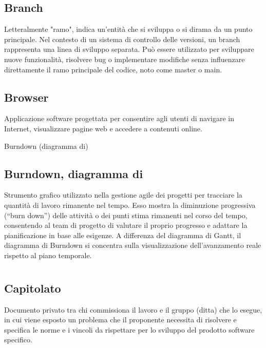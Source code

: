 \hypertarget{sec:branch}{}
\subsection*{Branch}
Letteralmente "ramo", indica un’entità che si sviluppa o si dirama da un punto principale. Nel contesto di un sistema di controllo delle versioni, 
un branch rappresenta una linea di sviluppo separata. Può essere utilizzato per sviluppare nuove funzionalità, risolvere bug o implementare modifiche 
senza influenzare direttamente il ramo principale del codice, noto come master o main.

\hypertarget{sec:browser}{}
\subsection*{Browser}
Applicazione software progettata per consentire agli utenti di navigare in Internet, visualizzare pagine web e accedere a contenuti online.

\hypertarget{sec:diagramma_di_burndown}{Burndown (diagramma di)}
\subsection*{Burndown, diagramma di}
Strumento grafico utilizzato nella gestione agile dei progetti per tracciare la quantità di lavoro rimanente nel tempo. 
Esso mostra la diminuzione progressiva (“burn down”) delle attività o dei punti stima rimanenti nel corso del tempo, 
consentendo al team di progetto di valutare il proprio progresso e adattare la pianificazione in base alle esigenze. 
A differenza del diagramma di Gantt, il diagramma di Burndown si concentra sulla visualizzazione dell’avanzamento reale rispetto al piano temporale.

\newpage




\section{}

\hypertarget{sec:capitolato}{}
\subsection*{Capitolato}
Documento privato tra chi commissiona il lavoro e il gruppo (ditta) che lo esegue, in cui viene esposto un problema che il proponente necessita di risolvere 
e specifica le norme e i vincoli da rispettare per lo sviluppo del prodotto software specifico.

